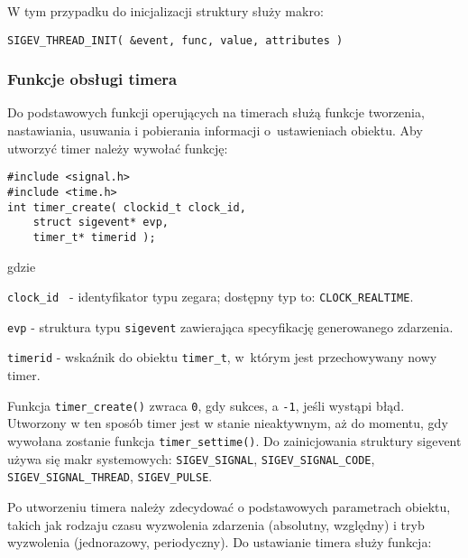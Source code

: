 W tym przypadku do inicjalizacji struktury służy makro: 

\begin{lstlisting}[style=MyCStyle] 
SIGEV_THREAD_INIT( &event, func, value, attributes )
\end{lstlisting}

\subsubsection{Funkcje obsługi timera}

Do podstawowych funkcji operujących na timerach służą funkcje tworzenia, nastawiania, usuwania i pobierania informacji o~ustawieniach obiektu. Aby utworzyć timer należy wywołać funkcję: 

\begin{lstlisting}[style=MyCStyle] 
#include <signal.h>
#include <time.h>
int timer_create( clockid_t clock_id,
	struct sigevent* evp,
	timer_t* timerid );
\end{lstlisting}

\noindent 
gdzie 

\begin{myitemize}
\item[] \lstinline[style=MyCStyle]{clock_id } - identyfikator typu zegara; dostępny typ to: \lstinline[style=MyCStyle]{CLOCK_REALTIME}.
\item[] \lstinline[style=MyCStyle]{evp} - struktura typu \lstinline[style=MyCStyle]{sigevent} zawierająca specyfikację generowanego zdarzenia.
\item[] \lstinline[style=MyCStyle]{timerid} - wskaźnik do obiektu \lstinline[style=MyCStyle]{timer_t}, w~którym jest przechowywany nowy timer.
\end{myitemize}

Funkcja \lstinline[style=MyCStyle]{timer_create()} zwraca \lstinline[style=MyCStyle]{0}, gdy sukces, a \lstinline[style=MyCStyle]{-1}, jeśli wystąpi błąd. Utworzony w ten sposób timer jest w stanie nieaktywnym, aż do momentu, gdy wywołana zostanie funkcja \lstinline[style=MyCStyle]{timer_settime()}. Do zainicjowania struktury sigevent używa się makr systemowych: \lstinline[style=MyCStyle]{SIGEV_SIGNAL}, \lstinline[style=MyCStyle]{SIGEV_SIGNAL_CODE}, \lstinline[style=MyCStyle]{SIGEV_SIGNAL_THREAD}, \lstinline[style=MyCStyle]{SIGEV_PULSE}. 

Po utworzeniu timera należy zdecydować o podstawowych parametrach obiektu, takich jak rodzaju czasu wyzwolenia zdarzenia (absolutny, względny) i tryb wyzwolenia (jednorazowy, periodyczny). Do ustawianie timera służy funkcja: 

